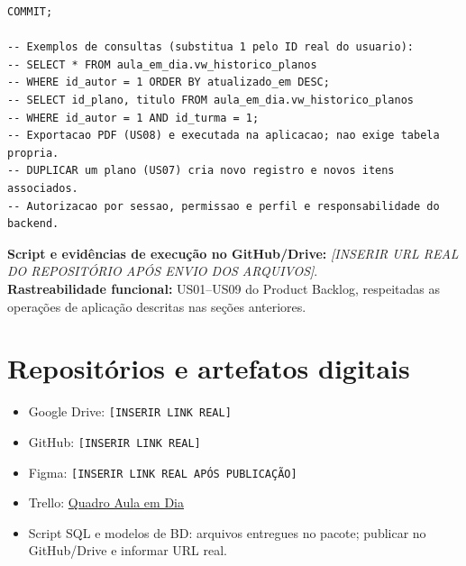 \documentclass[12pt,a4paper,oneside]{report}
\begin{document}
\begin{lstlisting}[style=aulasql,caption={Código SQL completo do banco de dados Aula em Dia},label={lst:bd-ddl}]
COMMIT;

-- Exemplos de consultas (substitua 1 pelo ID real do usuario):
-- SELECT * FROM aula_em_dia.vw_historico_planos
-- WHERE id_autor = 1 ORDER BY atualizado_em DESC;
-- SELECT id_plano, titulo FROM aula_em_dia.vw_historico_planos
-- WHERE id_autor = 1 AND id_turma = 1;
-- Exportacao PDF (US08) e executada na aplicacao; nao exige tabela propria.
-- DUPLICAR um plano (US07) cria novo registro e novos itens associados.
-- Autorizacao por sessao, permissao e perfil e responsabilidade do backend.
\end{lstlisting}

\noindent\textbf{Script e evidências de execução no GitHub/Drive:} \emph{[INSERIR URL REAL DO REPOSITÓRIO APÓS ENVIO DOS ARQUIVOS]}.\\
\textbf{Rastreabilidade funcional:} US01--US09 do Product Backlog, respeitadas as operações de aplicação descritas nas seções anteriores.

\section{Repositórios e artefatos digitais}
\begin{itemize}
 \item Google Drive: \texttt{[INSERIR LINK REAL]}
 \item GitHub: \texttt{[INSERIR LINK REAL]}
 \item Figma: \texttt{[INSERIR LINK REAL APÓS PUBLICAÇÃO]}
 \item Trello: \href{https://trello.com/b/vuNmlqB8/aula-em-dia-engenharia-de-software-3}{Quadro Aula em Dia}
 \item Script SQL e modelos de BD: arquivos entregues no pacote; publicar no GitHub/Drive e informar URL real.
\end{itemize}
\end{document}
